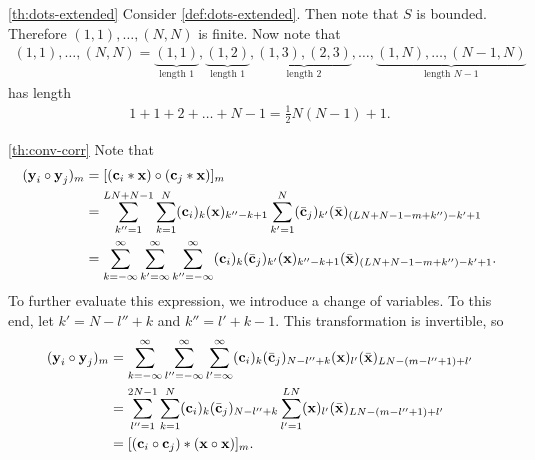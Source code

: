 \documentclass[a4paper, openany, oneside]{memoir}
\begin{document}
\begin{blockProofTheorem}{\ref{th:dots-extended}}
    Consider \cref{def:dots-extended}. Then note that $S$ is bounded. Therefore $(1,1),\ldots,(N,N)$ is finite. Now note that
    \begin{align*}
        (1,1),\ldots,(N,N) =
        \underbrace{(1,1)}_{\text{length } 1},
        \underbrace{(1,2)}_{\text{length } 1},
        \underbrace{(1,3),(2,3)}_{\text{length } 2},
        \ldots,
        \underbrace{(1,N),\ldots,(N-1,N)}_{\text{length } N-1}
    \end{align*}
    has length
    \begin{align*}
        1+1+2+\ldots+N-1 = \frac{1}{2}N(N-1)+1.
    \end{align*}
\end{blockProofTheorem}

\begin{blockProofTheorem}{\ref{th:conv-corr}}
    Note that
    \begin{align*}
        (\boldsymbol{\mathbf{y}}_i \circ \boldsymbol{\mathbf{y}}_j)_m
        &= [(\boldsymbol{\mathbf{c}}_i \ast \boldsymbol{\mathbf{x}}) \circ (\boldsymbol{\mathbf{c}}_j \ast \boldsymbol{\mathbf{x}})]_m \\
        &=\sum_{k''=1}^{LN+N-1}\sum_{k=1}^N (\boldsymbol{\mathbf{c}}_i)_k (\boldsymbol{\mathbf{x}})_{k''-k+1}\sum_{k'=1}^{N}(\bar{\boldsymbol{\mathbf{c}}}_j)_{k'}(\bar{\boldsymbol{\mathbf{x}}})_{(LN+N-1-m+k'')-k'+1} \\
        &=\sum_{k=-\infty}^\infty\sum_{k'=\infty}^{\infty}\sum_{k''=-\infty}^{\infty} (\boldsymbol{\mathbf{c}}_i)_k (\bar{\boldsymbol{\mathbf{c}}}_j)_{k'}(\boldsymbol{\mathbf{x}})_{k''-k+1}(\bar{\boldsymbol{\mathbf{x}}})_{(LN+N-1-m+k'')-k'+1}.
    \end{align*}
    To further evaluate this expression, we introduce a change of variables. To this end, let $k' = N -l'' +k$ and $k'' = l' + k - 1$. This transformation is invertible, so
    \begin{align*}
        (\boldsymbol{\mathbf{y}}_i \circ \boldsymbol{\mathbf{y}}_j)_m
        &=\sum_{k=-\infty}^\infty\sum_{l''=-\infty}^{\infty}\sum_{l'=\infty}^{\infty} (\boldsymbol{\mathbf{c}}_i)_k (\bar{\boldsymbol{\mathbf{c}}}_j)_{N -l'' +k}(\boldsymbol{\mathbf{x}})_{l'}
        (\bar{\boldsymbol{\mathbf{x}}})_{LN-(m-l'' + 1)+l'} \\
        &=\sum_{l''=1}^{2N-1}\sum_{k=1}^{N}(\boldsymbol{\mathbf{c}}_i)_k (\bar{\boldsymbol{\mathbf{c}}}_j)_{N -l'' +k}\sum_{l'=1}^{LN}(\boldsymbol{\mathbf{x}})_{l'}
        (\bar{\boldsymbol{\mathbf{x}}})_{LN-(m-l'' + 1)+l'} \\
        &=[(\boldsymbol{\mathbf{c}}_i \circ \boldsymbol{\mathbf{c}}_j) \ast (\boldsymbol{\mathbf{x}} \circ \boldsymbol{\mathbf{x}})]_m.
    \end{align*}
\end{blockProofTheorem}
\end{document}
